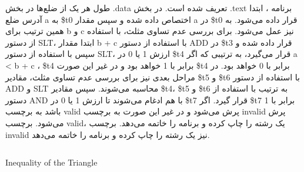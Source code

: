 \normalfont
{طول هر یک از ضلع‌ها در بخش .data تعریف شده است. در بخش .text برنامه ، ابتدا آدرس ضلع a به \$t0 اختصاص داده شده و سپس مقدار a در \$t0 قرار داده می‌شود. به همین ترتیب برای b و c نیز عمل می‌شود. برای بررسی عدم تساوی مثلث، با استفاده از دستور SLT، ابتدا مقدار b + c با استفاده از دستور ADD در \$t3 قرار داده شده و سپس با استفاده از دستور SLT، ارزش 1 یا 0 در \$t4 قرار می‌گیرد، به ترتیبی که اگر a < b + c ، \$t4 برابر با 1 خواهد بود و در غیر این صورت \$t4 برابر با 0 خواهد بود. در مراحل بعدی نیز برای بررسی عدم تساوی مثلث، مقادیر \$t5 و \$t6 با استفاده از دستور ADD و SLT محاسبه می‌شوند. سپس مقادیر \$t4، \$t5 و \$t6 به ترتیب با استفاده از دستور AND با هم ادغام می‌شوند تا ارزش 1 یا 0 در \$t7 قرار گیرد. اگر \$t7 برابر با 1 باشد به برچسب valid پرش می‌شود و در غیر این صورت به برچسب invalid پرش می‌شود. برچسب valid، یک رشته  را چاپ کرده و برنامه را خاتمه می‌دهد. برچسب invalid نیز یک رشته  را چاپ کرده و برنامه را خاتمه می‌دهد.}

\begin{latin}
\begin{listing}[H]
    \inputminted[linenos=true]{asm}{sources/Inequality_of_the_Triangle.mips}
    \caption{Inequality of the Triangle}
    \label{Inequality-of-the-Triangle}
\end{listing}

\end{latin}


